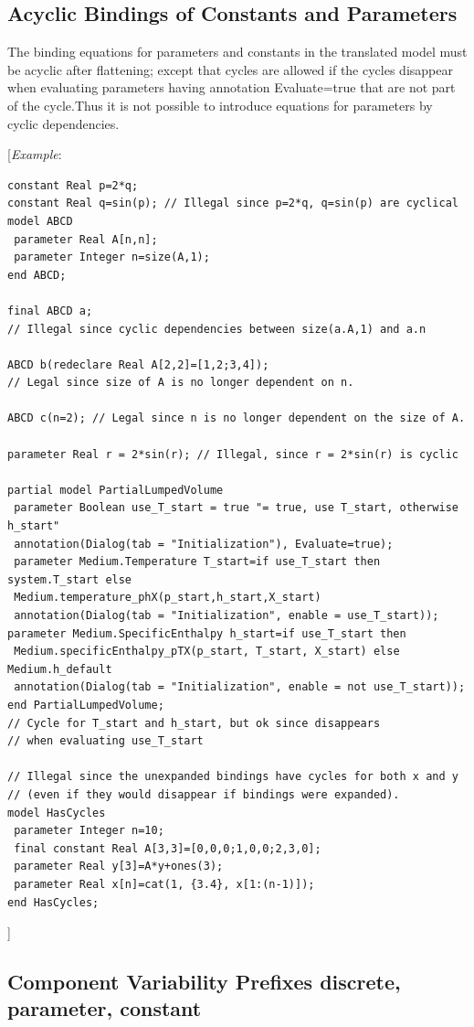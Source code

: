 \documentclass[10pt,a4paper]{report}
\def\Mcommentbegin#1{{[}\emph{#1}}
\def\Mcommentend#1{\emph{#1}{]}}
\def\doublelabel#1{\label{#1}\hypertarget{#1}{}}
\begin{document}
\subsection{Acyclic Bindings of Constants and Parameters}

The binding equations for parameters and constants in the translated
model must be acyclic after flattening; except that cycles are allowed
if the cycles disappear when evaluating parameters having annotation
Evaluate=true that are not part of the cycle.Thus it is not possible to
introduce equations for parameters by cyclic dependencies.

\Mcommentbegin{Example}:
\begin{lstlisting}[language=modelica]
constant Real p=2*q;
constant Real q=sin(p); // Illegal since p=2*q, q=sin(p) are cyclical
model ABCD
 parameter Real A[n,n];
 parameter Integer n=size(A,1);
end ABCD;

final ABCD a;
// Illegal since cyclic dependencies between size(a.A,1) and a.n

ABCD b(redeclare Real A[2,2]=[1,2;3,4]);
// Legal since size of A is no longer dependent on n.

ABCD c(n=2); // Legal since n is no longer dependent on the size of A.

parameter Real r = 2*sin(r); // Illegal, since r = 2*sin(r) is cyclic

partial model PartialLumpedVolume
 parameter Boolean use_T_start = true "= true, use T_start, otherwise h_start"
 annotation(Dialog(tab = "Initialization"), Evaluate=true);
 parameter Medium.Temperature T_start=if use_T_start then system.T_start else
 Medium.temperature_phX(p_start,h_start,X_start)
 annotation(Dialog(tab = "Initialization", enable = use_T_start));
parameter Medium.SpecificEnthalpy h_start=if use_T_start then
 Medium.specificEnthalpy_pTX(p_start, T_start, X_start) else Medium.h_default
 annotation(Dialog(tab = "Initialization", enable = not use_T_start));
end PartialLumpedVolume;
// Cycle for T_start and h_start, but ok since disappears
// when evaluating use_T_start

// Illegal since the unexpanded bindings have cycles for both x and y
// (even if they would disappear if bindings were expanded).
model HasCycles
 parameter Integer n=10;
 final constant Real A[3,3]=[0,0,0;1,0,0;2,3,0];
 parameter Real y[3]=A*y+ones(3);
 parameter Real x[n]=cat(1, {3.4}, x[1:(n-1)]);
end HasCycles;
\end{lstlisting}
\Mcommentend{}

\subsection{Component Variability Prefixes discrete, parameter, constant}\doublelabel{component-variability-prefixes}
\end{document}
